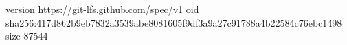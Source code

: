 version https://git-lfs.github.com/spec/v1
oid sha256:417d862b9eb7832a3539abe8081605f9df3a9a27c91788a4b22584c76ebc1498
size 87544
